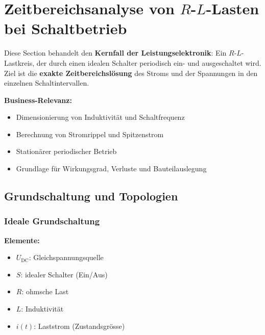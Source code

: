 \section{Zeitbereichsanalyse von $R$-$L$-Lasten bei Schaltbetrieb}

Diese Section behandelt den \textbf{Kernfall der Leistungselektronik}:
Ein $R$-$L$-Lastkreis, der durch einen idealen Schalter periodisch ein- und ausgeschaltet wird.
Ziel ist die \textbf{exakte Zeitbereichslösung} des Stroms und der Spannungen in den einzelnen Schaltintervallen.

\smallskip

\textbf{Business-Relevanz:}
\begin{itemize}
    \item Dimensionierung von Induktivität und Schaltfrequenz
    \item Berechnung von Stromrippel und Spitzenstrom
    \item Stationärer periodischer Betrieb
    \item Grundlage für Wirkungsgrad, Verluste und Bauteilauslegung
\end{itemize}

\subsection{Grundschaltung und Topologien}

\subsubsection{Ideale Grundschaltung}

\begin{center}
\end{center}

\textbf{Elemente:}
\begin{itemize}
    \item $U_{\mathrm{DC}}$: Gleichspannungsquelle
    \item $S$: idealer Schalter (Ein/Aus)
    \item $R$: ohmsche Last
    \item $L$: Induktivität
    \item $i(t)$: Laststrom (Zustandsgrösse)
\end{itemize}

